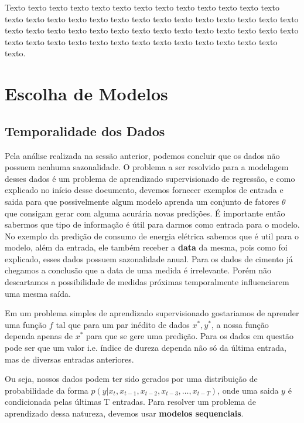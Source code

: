 Texto texto texto texto texto texto texto texto texto texto texto texto texto
texto texto texto texto texto texto texto texto texto texto texto texto texto
texto texto texto texto texto texto texto texto texto texto texto texto texto
texto texto texto texto texto texto texto texto texto texto texto texto texto
texto texto texto.

\section{Escolha de Modelos}

\subsection{Temporalidade dos Dados}

Pela análise realizada na sessão anterior, podemos concluir que os dados não possuem nenhuma sazonalidade. O problema a ser resolvido para a modelagem desses dados é um problema de aprendizado supervisionado de regressão, e como explicado no início desse documento, devemos fornecer exemplos de entrada e saida para que possivelmente algum modelo aprenda um conjunto de fatores $\theta$ que consigam gerar com alguma acurária novas predições. É importante então sabermos que tipo de informação é útil para darmos como entrada para o modelo. No exemplo da predição de consumo de energia elétrica sabemos que é util para o modelo, além da entrada, ele também receber a \textbf{data} da mesma, pois como foi explicado, esses dados possuem sazonalidade anual. Para os dados de cimento já chegamos a conclusão que a data de uma medida é irrelevante. Porém não descartamos a possibilidade de medidas próximas temporalmente influenciarem uma mesma saída.

Em um problema simples de aprendizado supervisionado gostariamos de aprender uma função $f$ tal que para um par inédito de dados $x^*,y^*$, a nossa função dependa apenas de $x^*$ para que se gere uma predição. Para os dados em questão pode ser que um valor i.e. índice de dureza dependa não só da última entrada, mas de diversas entradas anteriores. 

Ou seja, nossos dados podem ter sido gerados por uma distribuição de probabilidade da forma $p(y | x_{t} ,x_{t -1},x_{t -2},x_{t-3} , \dots, x_{t-T})$, onde uma saida $y$ é condicionada pelas últimas T entradas. Para resolver um problema de aprendizado dessa natureza, devemos usar \textbf{modelos sequenciais}. 

